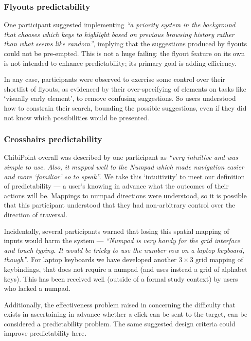 \documentclass[11pt,openright,a4paper]{report}
\begin{document}
\subsubsection{Flyouts predictability}
One participant suggested implementing \textit{``a priority system in the background that chooses which keys to highlight based on previous browsing history rather than what seems like random''}, implying that the suggestions produced by flyouts could not be pre-empted. This is not a huge failing: the flyout feature on its own is not intended to enhance predictability; its primary goal is adding efficiency.

In any case, participants were observed to exercise some control over their shortlist of flyouts, as evidenced by their over-specifying of elements on tasks like `visually early element', to remove confusing suggestions. So users understood how to constrain their search, bounding the possible suggestions, even if they did not know which possibilities would be presented.

\subsubsection{Crosshairs predictability}
ChibiPoint overall was described by one participant as \textit{``very intuitive and was simple to use. Also, it mapped well to the Numpad which made navigation easier and more `familiar' so to speak''}. We take this `intuitivity' to meet our definition of predictability --- a user's knowing in advance what the outcomes of their actions will be. Mappings to numpad directions were understood, so it is possible that this participant understood that they had non-arbitrary control over the direction of traversal.

Incidentally, several participants warned that losing this spatial mapping of inputs would harm the system --- \textit{``Numpad is very handy for the grid interface and touch typing. It would be tricky to use the number row on a laptop keyboard, though''}. For laptop keyboards we have developed another $3\times3$ grid mapping of keybindings, that does not require a numpad (and uses instead a grid of alphabet keys). This has been received well (outside of a formal study context) by users who lacked a numpad.

Additionally, the effectiveness problem raised in  concerning the difficulty that exists in ascertaining in advance whether a click can be sent to the target, can be considered a predictability problem. The same suggested design criteria could improve predictability here.
\end{document}
